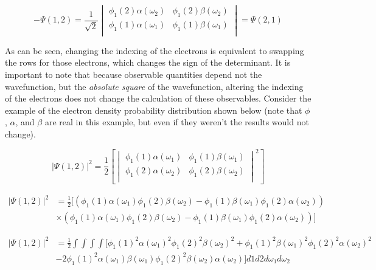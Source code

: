 \begin{equation}
\label{eq:pauli_2t_4}
-\Psi(1,2) =
\frac{1}{\sqrt{2}}
\begin{vmatrix}
\phi_{1}(2)\alpha(\omega_{2})	&	\phi_{1}(2)\beta(\omega_{2})	\\
\phi_{1}(1)\alpha(\omega_{1})	&	\phi_{1}(1)\beta(\omega_{1})	\\
\end{vmatrix}
=\Psi(2,1)
\end{equation}

As can be seen, changing the indexing of the electrons is equivalent to swapping the rows for those electrons, which changes the sign of the determinant. It is important to note that because observable quantities depend not the wavefunction, but the \textit{absolute square} of the wavefunction, altering the indexing of the electrons does not change the calculation of these observables. Consider the example of the electron density probability distribution shown below (note that $\phi$, $\alpha$, and $\beta$ are real in this example, but even if they weren't the results would not change).

\begin{equation}
\label{eq:el_prob_dist_1}
|\Psi(1,2)|^{2} =
\frac{1}{2}\left[
\begin{vmatrix}
\phi_{1}(1)\alpha(\omega_{1})		&	\phi_{1}(1)\beta(\omega_{1})		\\
\phi_{1}(2)\alpha(\omega_{2})		&	\phi_{1}(2)\beta(\omega_{2})		\\
\end{vmatrix}^2
\right]
\end{equation}

\begin{equation}
\label{eq:el_prob_dist_2}
\begin{split}
|\Psi(1,2)|^{2}	&	=
\frac{1}{2}
[
\left(
\phi_{1}(1)\alpha(\omega_{1})\phi_{1}(2)\beta(\omega_{2}) -
\phi_{1}(1)\beta(\omega_{1})\phi_{1}(2)\alpha(\omega_{2})
\right)	\\
	&	\times\left(
\phi_{1}(1)\alpha(\omega_{1})\phi_{1}(2)\beta(\omega_{2}) -
\phi_{1}(1)\beta(\omega_{1})\phi_{1}(2)\alpha(\omega_{2})
\right)
]
\end{split}
\end{equation}

\begin{equation}
\label{eq:el_prob_dist_3}
\begin{split}
|\Psi(1,2)|^{2}	&	=
\frac{1}{2}\int\int\int\int
[
\phi_{1}(1)^{2}\alpha(\omega_{1})^{2}\phi_{1}(2)^{2}\beta(\omega_{2})^{2} +
\phi_{1}(1)^{2}\beta(\omega_{1})^{2}\phi_{1}(2)^{2}\alpha(\omega_{2})^{2}
	\\
	&	-2
\phi_{1}(1)^{2}\alpha(\omega_{1})\beta(\omega_{1})\phi_{1}(2)^{2}\beta(\omega_{2})\alpha(\omega_{2})
]d1d2d\omega_{1}d\omega_{2}
\end{split}
\end{equation}


